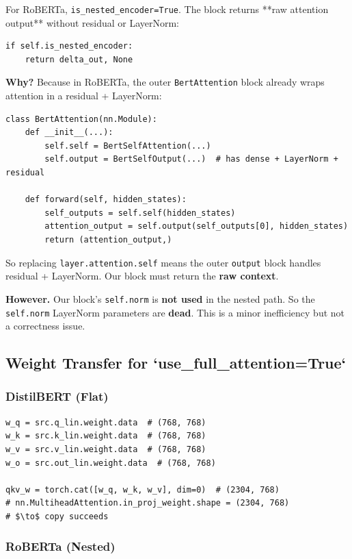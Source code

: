 For RoBERTa, \texttt{is\_nested\_encoder=True}. The block returns **raw attention 
output** without residual or LayerNorm:

\begin{lstlisting}
if self.is_nested_encoder:
    return delta_out, None
\end{lstlisting}

\textbf{Why?} Because in RoBERTa, the outer \texttt{BertAttention} block already wraps 
attention in a residual + LayerNorm:

\begin{lstlisting}
class BertAttention(nn.Module):
    def __init__(...):
        self.self = BertSelfAttention(...)
        self.output = BertSelfOutput(...)  # has dense + LayerNorm + residual
    
    def forward(self, hidden_states):
        self_outputs = self.self(hidden_states)
        attention_output = self.output(self_outputs[0], hidden_states)
        return (attention_output,)
\end{lstlisting}

So replacing \texttt{layer.attention.self} means the outer \texttt{output} block handles 
residual + LayerNorm. Our block must return the \textbf{raw context}.

\textbf{However.} Our block's \texttt{self.norm} is \textbf{not used} in the nested path. So 
the \texttt{self.norm} LayerNorm parameters are \textbf{dead}. This is a minor 
inefficiency but not a correctness issue.

\subsection{Weight Transfer for `use\_full\_attention=True`}

\subsubsection{DistilBERT (Flat)}

\begin{lstlisting}
w_q = src.q_lin.weight.data  # (768, 768)
w_k = src.k_lin.weight.data  # (768, 768)
w_v = src.v_lin.weight.data  # (768, 768)
w_o = src.out_lin.weight.data  # (768, 768)

qkv_w = torch.cat([w_q, w_k, w_v], dim=0)  # (2304, 768)
# nn.MultiheadAttention.in_proj_weight.shape = (2304, 768)
# $\to$ copy succeeds
\end{lstlisting}

\subsubsection{RoBERTa (Nested)}

